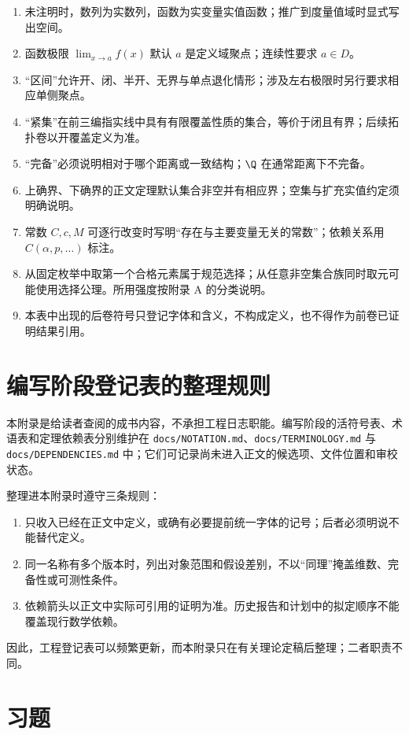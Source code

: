 \begin{enumerate}
 \item 未注明时，数列为实数列，函数为实变量实值函数；推广到度量值域时显式写出空间。
 \item 函数极限 \(\lim_{x\to a}f(x)\) 默认 \(a\) 是定义域聚点；连续性要求 \(a\in D\)。
 \item “区间”允许开、闭、半开、无界与单点退化情形；涉及左右极限时另行要求相应单侧聚点。
 \item “紧集”在前三编指实线中具有有限覆盖性质的集合，等价于闭且有界；后续拓扑卷以开覆盖定义为准。
 \item “完备”必须说明相对于哪个距离或一致结构；\(\Q\) 在通常距离下不完备。
 \item 上确界、下确界的正文定理默认集合非空并有相应界；空集与扩充实值约定须明确说明。
 \item 常数 \(C,c,M\) 可逐行改变时写明“存在与主要变量无关的常数”；依赖关系用 \(C(\alpha,p,\ldots)\) 标注。
 \item 从固定枚举中取第一个合格元素属于规范选择；从任意非空集合族同时取元可能使用选择公理。所用强度按附录 A 的分类说明。
 \item 本表中出现的后卷符号只登记字体和含义，不构成定义，也不得作为前卷已证明结果引用。
\end{enumerate}

\section{编写阶段登记表的整理规则}

本附录是给读者查阅的成书内容，不承担工程日志职能。编写阶段的活符号表、术语表和定理依赖表分别维护在
\texttt{docs/NOTATION.md}、\texttt{docs/TERMINOLOGY.md} 与
\texttt{docs/DEPENDENCIES.md} 中；它们可记录尚未进入正文的候选项、文件位置和审校状态。

整理进本附录时遵守三条规则：
\begin{enumerate}
 \item 只收入已经在正文中定义，或确有必要提前统一字体的记号；后者必须明说不能替代定义。
 \item 同一名称有多个版本时，列出对象范围和假设差别，不以“同理”掩盖维数、完备性或可测性条件。
 \item 依赖箭头以正文中实际可引用的证明为准。历史报告和计划中的拟定顺序不能覆盖现行数学依赖。
\end{enumerate}
因此，工程登记表可以频繁更新，而本附录只在有关理论定稿后整理；二者职责不同。

\section*{习题}

